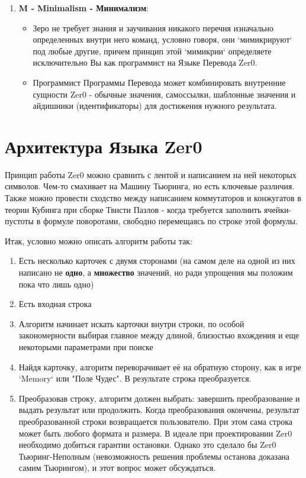 \documentclass{book}
\begin{document}
\begin{enumerate}
\item \textbf{M - Minimalism - Минимализм}:

\begin{itemize}
\item Зеро не требует знания и заучивания никакого перечня изначально определенных внутри него команд, условно говоря, они `мимикрируют` под любые другие, причем принцип этой `мимикрии` определяете исключительно Вы как программист на Языке Перевода Zer0.
\item Программист Программы Перевода может комбинировать внутренние сущности Zer0 - обычные значения, самоссылки, шаблонные значения и айдишники (идентификаторы) для достижения нужного результата.
\end{itemize}

\end{enumerate}

\newpage

\chapter{Архитектура Языка Zer0}

Принцип работы Zer0 можно сравнить с лентой и написанием на ней некоторых символов. Чем-то смахивает на Машину Тьюринга, но есть ключевые различия. Также можно провести сходство между написанием коммутаторов и конжугатов в теории Кубинга при сборке Твисти Пазлов - когда требуется заполнить ячейки-пустоты в формуле поворотами, свободно перемещаясь по строке этой формулы.

Итак, условно можно описать алгоритм работы так:

\begin{enumerate}

\item Есть несколько карточек с двумя сторонами (на самом деле на одной из них написано не \textbf{одно}, а \textbf{множество} значений, но ради упрощения мы положим пока что лишь одно)

\item Есть входная строка

\item Алгоритм начинает искать карточки внутри строки, по особой закономерности выбирая главное между длиной, близостью вхождения и еще некоторыми параметрами при поиске

\item Найдя карточку, алгоритм переворачивает её на обратную сторону, как в игре `Memory` или "Поле Чудес". В результате строка преобразуется.

\item Преобразовав строку, алгоритм должен выбрать: завершить преобразование и выдать результат или продолжить. Когда преобразования окончены, результат преобразованной строки возвращается пользователю. При этом сама строка может быть любого формата и размера. В идеале при проектировании Zer0 необходимо добиться гарантии остановки. Однако это сделало бы Zer0 Тьюринг-Неполным (невозможность решения проблемы останова доказана самим Тьюрингом), и этот вопрос может обсуждаться.

\end{enumerate}
\end{document}
